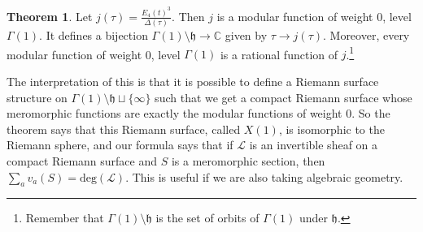\documentclass{article}
\theoremstyle{definition}
\newtheorem{theorem}{Theorem}[section]
\begin{document}
\begin{theorem}
    Let $j(\tau) = \frac{E_4(t)^3}{\Delta(\tau)}$. Then $j$ is a modular function of weight $0$, level $\Gamma(1)$. It defines a bijection $\Gamma(1)\setminus \mathfrak{h} \to \mathbb{C}$ given by $\tau \to j (\tau)$. Moreover, every modular function of weight 0, level $\Gamma(1)$ is a rational function of $j$.\footnote{Remember that $\Gamma(1)\setminus \mathfrak{h}$ is the set of orbits of $\Gamma(1)$ under $\mathfrak{h}$.}
\end{theorem}
The interpretation of this is that it is possible to define a Riemann surface structure on $\Gamma(1)\setminus \mathfrak{h} \sqcup \{\infty\}$ such that we get a compact Riemann surface whose meromorphic functions are exactly the modular functions of weight 0. So the theorem says that this Riemann surface, called $X(1)$, is isomorphic to the Riemann sphere, and our formula says that if $\mathcal{L}$ is an invertible sheaf on a compact Riemann surface and $S$ is a meromorphic section, then $\sum_{a}^{} v_a(S) = \text{deg}(\mathcal{L})$. This is useful if we are also taking algebraic geometry.
\end{document}
